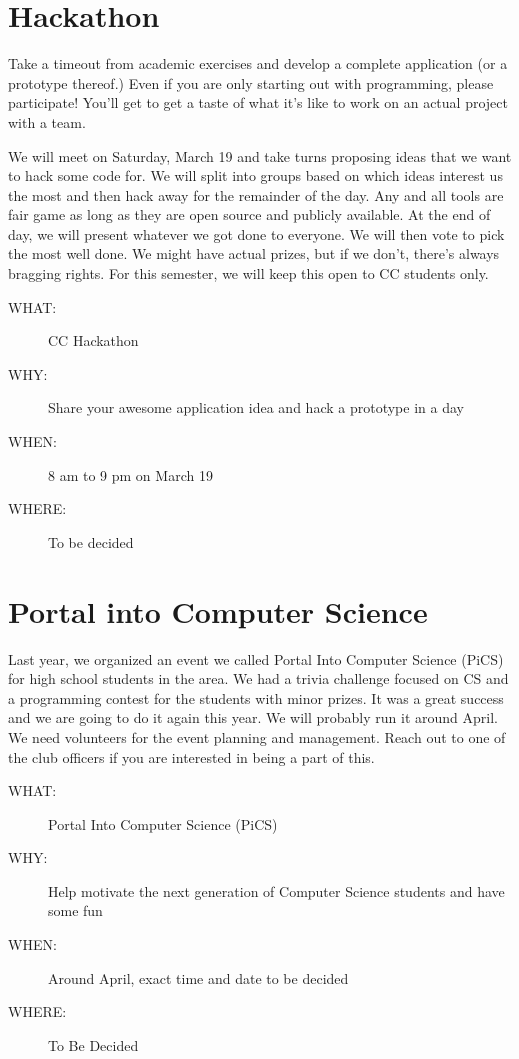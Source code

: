 \section{Hackathon}
\label{sec-8}

Take a timeout from academic exercises and develop a complete application (or a
prototype thereof.) Even if you are only starting out with programming, please
participate! You'll get to get a taste of what it's like to work on an actual
project with a team.

We will meet on Saturday, March 19 and take turns proposing ideas that we want
to hack some code for. We will split into groups based on which ideas interest
us the most and then hack away for the remainder of the day. Any and all tools
are fair game as long as they are open source and publicly available. At the
end of day, we will present whatever we got done to everyone. We will then vote
to pick the most well done. We might have actual prizes, but if we don't,
there's always bragging rights. For this semester, we will keep this open to CC
students only.

\begin{description}
\item[{WHAT:}] CC Hackathon
\item[{WHY:}] Share your awesome application idea and hack a prototype in a day
\item[{WHEN:}] 8 am to 9 pm on March 19
\item[{WHERE:}] To be decided
\end{description}


\newpage


\section{Portal into Computer Science}
\label{sec-9}

Last year, we organized an event we called Portal Into Computer Science (PiCS)
for high school students in the area. We had a trivia challenge focused on CS
and a programming contest for the students with minor prizes. It was a great
success and we are going to do it again this year. We will probably run it
around April. We need volunteers for the event planning and management. Reach
out to one of the club officers if you are interested in being a part of this.

\begin{description}
\item[{WHAT:}] Portal Into Computer Science (PiCS)
\item[{WHY:}] Help motivate the next generation of Computer Science students and have some fun
\item[{WHEN:}] Around April, exact time and date to be decided
\item[{WHERE:}] To Be Decided
\end{description}



